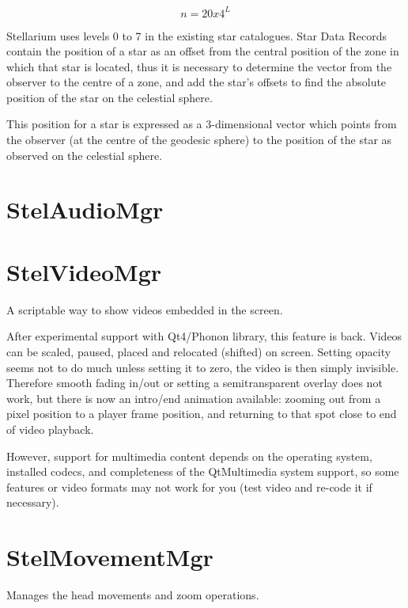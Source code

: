 \begin{equation}
n=20 x 4^L
\end{equation}

Stellarium uses levels 0 to 7 in the existing star catalogues. Star Data Records contain the position of a star as an offset from the central position of the zone in which that star is located, thus it is necessary to determine the vector from the observer to the centre of a zone, and add the star's offsets to find the absolute position of the star on the celestial sphere.

This position for a star is expressed as a 3-dimensional vector which points from the observer (at the centre of the geodesic sphere) to the position of the star as observed on the celestial sphere.

\section{StelAudioMgr}
\label{sec:ScriptingAPI:StelAudioMgr}

\section{StelVideoMgr}
\label{sec:ScriptingAPI:StelVideoMgr}

A scriptable way to show videos embedded in the screen.

After experimental support with Qt4/Phonon library, this feature is back. Videos can be scaled, paused, placed and relocated (shifted) on screen. Setting opacity seems not to do much unless setting it to zero, the video is then simply invisible. Therefore smooth fading in/out or setting a semitransparent overlay does not work, but there is now an intro/end animation available: zooming out from a pixel position to a player frame position, and returning to that spot close to end of video playback.

However, support for multimedia content depends on the operating system, installed codecs, and completeness of the QtMultimedia system support, so some features or video formats may not work for you (test video and re-code it if necessary).

\section{StelMovementMgr}
\label{sec:ScriptingAPI:StelMovementMgr}

Manages the head movements and zoom operations.

